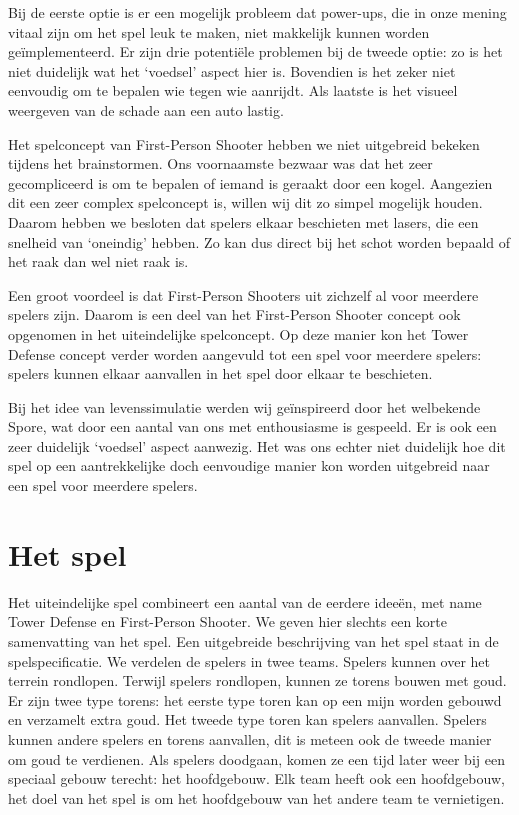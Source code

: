 Bij de eerste optie is er een mogelijk probleem dat power-ups, die in onze mening vitaal zijn om het spel leuk te maken, niet makkelijk kunnen worden ge\"implementeerd. Er zijn drie potenti\"ele problemen bij de tweede optie: zo is het niet duidelijk wat het `voedsel' aspect hier is. Bovendien is het zeker niet eenvoudig om te bepalen wie tegen wie aanrijdt. Als laatste is het visueel weergeven van de schade aan een auto lastig.

Het spelconcept van First-Person Shooter hebben we niet uitgebreid bekeken tijdens het brainstormen. Ons voornaamste bezwaar was dat het zeer gecompliceerd is om te bepalen of iemand is geraakt door een kogel. Aangezien dit een zeer complex spelconcept is, willen wij dit zo simpel mogelijk houden. Daarom hebben we besloten dat spelers elkaar beschieten met lasers, die een snelheid van `oneindig' hebben. Zo kan dus direct bij het schot worden bepaald of het raak dan wel niet raak is.

Een groot voordeel is dat First-Person Shooters uit zichzelf al voor meerdere spelers zijn. Daarom is een deel van het First-Person Shooter concept ook opgenomen in het uiteindelijke spelconcept. Op deze manier kon het Tower Defense concept verder worden aangevuld tot een spel voor meerdere spelers: spelers kunnen elkaar aanvallen in het spel door elkaar te beschieten.

Bij het idee van levenssimulatie werden wij ge\"inspireerd door het welbekende Spore, wat door een aantal van ons met enthousiasme is gespeeld. Er is ook een zeer duidelijk `voedsel' aspect aanwezig. Het was ons echter niet duidelijk hoe dit spel op een aantrekkelijke doch eenvoudige manier kon worden uitgebreid naar een spel voor meerdere spelers.

\section{Het spel}
Het uiteindelijke spel combineert een aantal van de eerdere idee\"en, met name Tower Defense en First-Person Shooter. We geven hier slechts een korte samenvatting van het spel. Een uitgebreide beschrijving van het spel staat in de spelspecificatie. We verdelen de spelers in twee teams. Spelers kunnen over het terrein rondlopen. Terwijl spelers rondlopen, kunnen ze torens bouwen met goud. Er zijn twee type torens: het eerste type toren kan op een mijn worden gebouwd en verzamelt extra goud. Het tweede type toren kan spelers aanvallen. Spelers kunnen andere spelers en torens aanvallen, dit is meteen ook de tweede manier om goud te verdienen. Als spelers doodgaan, komen ze een tijd later weer bij een speciaal gebouw terecht: het hoofdgebouw. Elk team heeft ook een hoofdgebouw, het doel van het spel is om het hoofdgebouw van het andere team te vernietigen.


